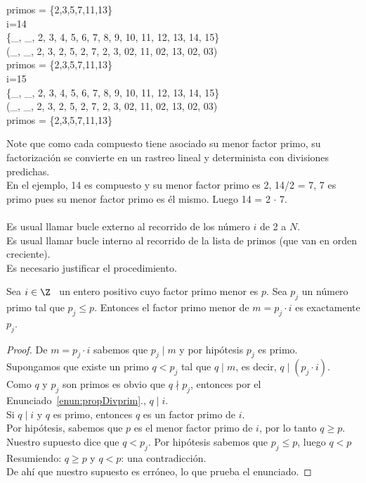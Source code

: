 \begin{ejemplo}
primos = \{2,3,5,7,11,13\} \\ 
i=14 \\ 
\{\_, \_, 2, 3, 4, 5, 6, 7, 8, 9, 10, 11, 12, 13, 14, 15\} \\ 
(\_, \_, 2, 3, 2, 5, 2, 7, 2, 3,  02, 11, 02, 13, 02, 03) \\ 
primos = \{2,3,5,7,11,13\} \\ 
i=15 \\ 
\{\_, \_, 2, 3, 4, 5, 6, 7, 8, 9, 10, 11, 12, 13, 14, 15\} \\ 
(\_, \_, 2, 3, 2, 5, 2, 7, 2, 3,  02, 11, 02, 13, 02, 03) \\ 
primos = \{2,3,5,7,11,13\}
\end{ejemplo}

Note que como cada compuesto tiene asociado su menor factor primo, su factorización se convierte en un rastreo lineal y determinista con divisiones predichas. \\
En el ejemplo, 14 es compuesto y su menor factor primo es 2, 14/2 = 7, 7 es primo pues su menor factor primo es él mismo. Luego 14 = 2 $\cdot$ 7.\\
\\
Es usual llamar bucle externo al recorrido de los número $i$ de 2 a $N$. \\
Es usual llamar bucle interno al recorrido de la lista de primos (que van en orden creciente). \\

Es necesario justificar el procedimiento.

\begin{enunciado}\label{enun:estabilidadMenorPrimo}\leavevmode\par
Sea $i \in \Z$ \, un entero positivo cuyo factor primo menor es $p$. Sea $p_j$ un número primo tal que $p_j \leq p$. Entonces el factor primo menor de $m = p_j \cdot i$ es exactamente $p_j$.        
\end{enunciado}

\begin{proof} De $m = p_j \cdot i$ sabemos que $p_j \mid m$ y por hipótesis $p_j$ es primo. \\
Supongamos que existe un primo $q < p_j$ tal que $q \mid m$, es decir, $q \mid (p_j \cdot i)$. \\
\setcounter{enumi}{2}
Como $q$ y $p_j$ son primos es obvio que $q \nmid p_j$, entonces por el Enunciado~\ref{enun:propDivprim}., $q \mid i$. \\
Si $q \mid i$ y $q$ es primo, entonces $q$ es un factor primo de $i$. \\
Por hipótesis, sabemos que $p$ es el menor factor primo de $i$, por lo tanto $q \geq p$. \\
Nuestro supuesto dice que $q < p_j$. Por hipótesis sabemos que  $p_j \leq p$, luego  $q < p$\\
Resumiendo: $q \geq p$ y $q < p$: una contradicción. \\
De ahí que nuestro supuesto es erróneo, lo que prueba el enunciado.
\end{proof}

